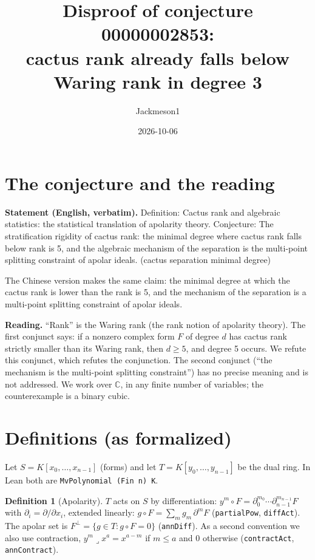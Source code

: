 \documentclass[11pt]{article}
\title{Disproof of conjecture 00000002853:\\ cactus rank already falls below Waring rank in degree 3}
\author{Jackmeson1}
\date{2026-10-06}
\theoremstyle{definition}
\newtheorem{definition}[theorem]{Definition}
\begin{document}
\maketitle

\section{The conjecture and the reading}

\textbf{Statement (English, verbatim).} Definition: Cactus rank and algebraic statistics: the
statistical translation of apolarity theory. Conjecture: The stratification rigidity of cactus
rank: the minimal degree where cactus rank falls below rank is 5, and the algebraic mechanism of
the separation is the multi-point splitting constraint of apolar ideals. (cactus separation
minimal degree)

The Chinese version makes the same claim: the minimal degree at which the cactus rank is lower
than the rank is 5, and the mechanism of the separation is a multi-point splitting constraint of
apolar ideals.

\textbf{Reading.} ``Rank'' is the Waring rank (the rank notion of apolarity theory). The first
conjunct says: if a nonzero complex form $F$ of degree $d$ has cactus rank strictly smaller than its
Waring rank, then $d\ge 5$, and degree 5 occurs. We refute this conjunct, which refutes the
conjunction. The second conjunct (``the mechanism is the multi-point splitting constraint'') has
no precise meaning and is not addressed. We work over $\mathbb C$, in any finite number of
variables; the counterexample is a binary cubic.

\section{Definitions (as formalized)}

Let $S=K[x_0,\dots,x_{n-1}]$ (forms) and let $T=K[y_0,\dots,y_{n-1}]$ be the dual ring. In Lean both
are \texttt{MvPolynomial (Fin n) K}.

\begin{definition}[Apolarity]
$T$ acts on $S$ by differentiation: $y^m\circ F=\partial_0^{m_0}\cdots\partial_{n-1}^{m_{n-1}}F$
with $\partial_i=\partial/\partial x_i$, extended linearly: $g\circ F=\sum_m g_m\,\partial^mF$
(\texttt{partialPow}, \texttt{diffAct}). The apolar set is $F^\perp=\{g\in T: g\circ F=0\}$
(\texttt{annDiff}). As a second convention we also use contraction, $y^m\lrcorner x^a=x^{a-m}$ if
$m\le a$ and $0$ otherwise (\texttt{contractAct}, \texttt{annContract}).
\end{definition}
\end{document}
